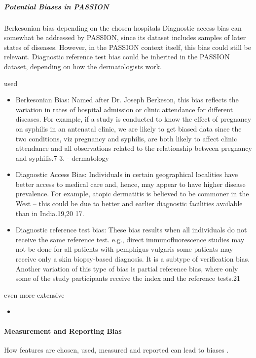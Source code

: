\documentclass[12pt, a4paper, oneside]{book}   	%
\newif\ifrawcitationactive
\newcommand{\rawcitationstart}{\color{purple}\rawcitationactivetrue}
\newcommand{\rawcitationend}{\color{black}\rawcitationactivefalse}
\newcommand{\rawcitationusedstart}{\color{violet}}
\newcommand{\rawcitationusedend}{%
	\ifrawcitationactive
	\color{purple}  %
	\else
	\color{black}  %
	\fi
}
\begin{document}
			\subparagraph{Potential Biases in PASSION}
			Berkesonian bias depending on the chosen hospitals
			Diagnostic access bias can somewhat be addressed by PASSION, since its dataset includes samples of later states of diseases. However, in the PASSION context itself, this bias could still be relevant.
			Diagnostic reference test bias could be inherited in the PASSION dataset, depending on how the dermatologists work.
			
			
			
			\rawcitationstart
			used
			\begin{itemize}		
				\rawcitationusedstart
					\item Berkesonian Bias: Named after Dr. Joseph Berkeson, this bias reflects the variation in rates of hospital admission or clinic attendance for different diseases. For example, if a study is conducted to know the effect of pregnancy on syphilis in an antenatal clinic, we are likely to get biased data since the two conditions, viz pregnancy and syphilis, are both likely to affect clinic attendance and all observations related to the relationship between pregnancy and syphilis.7 3. \autocite{Chakraborty_2023} - dermatology
					\item  Diagnostic Access Bias: Individuals in certain geographical localities have better access to medical care and, hence, may appear to have higher disease prevalence. For example, atopic dermatitis is believed to be commoner in the West – this could be due to better and earlier diagnostic facilities available than in India.19,20 17.\autocite{Chakraborty_2023}
					\item  Diagnostic reference test bias: These bias results when all individuals do not receive the same reference test. e.g., direct immunofluorescence studies may not be done for all patients with pemphigus vulgaris some patients may receive only a skin biopsy-based diagnosis. It is a subtype of verification bias. Another variation of this type of bias is partial reference bias, where only some of the study participants receive the index and the reference tests.21\autocite{Chakraborty_2023}
				\rawcitationusedend
			\end{itemize}
			
			even more extensive
			\begin{itemize}
				\item 
			\end{itemize}
			\rawcitationend
			
			
			\paragraph{Measurement and Reporting Bias \autocite{Mehrabi_2021} \autocite{Chakraborty_2024}}
			How features are chosen, used, measured and reported can lead to biases \autocites{Mehrabi_2021}{M144_Suresh_2021}.  
			
\end{document}
